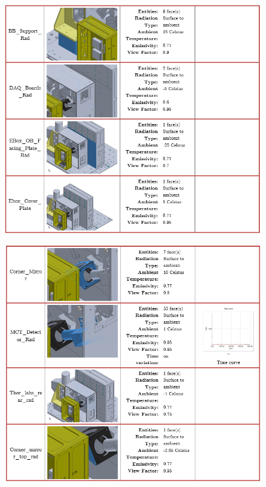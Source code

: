 \begin{figure}
    \centering
    \includegraphics[width=\textwidth]{thermal_load_images/float_TL_images/float_7.PNG}
\end{figure}

\begin{figure}
    \centering
    \includegraphics[width=\textwidth]{thermal_load_images/float_TL_images/float_8.PNG}
\end{figure}

